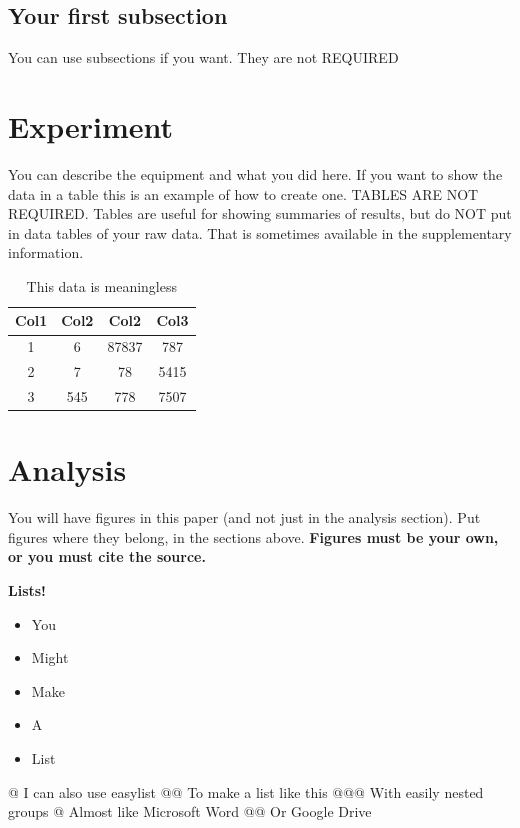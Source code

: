 \documentclass[aps,prb,twocolumn,groupedaddress,nofootinbib,floatfix]{revtex4}
\begin{document}
\subsection*{Your first subsection}
You can use subsections if you want. They are not REQUIRED


\section*{Experiment}

You can describe the equipment and what you did here.   
If you want to show the data in a table this is an example of how to create one. TABLES ARE NOT REQUIRED. Tables are useful for showing summaries of results, but do NOT put in data tables of your raw data. That is sometimes available in the supplementary information.

\begin{table}[h!]
\begin{center}
 \begin{tabular}{||c |||c c| c||} 
 \hline
 Col1 & Col2 & Col2 & Col3 \\
 \hline\hline
 1 & 6 & 87837 & 787 \\ 
 \hline
 2 & 7 & 78 & 5415 \\
 \hline
 3 & 545 & 778 & 7507 \\
 \hline
\end{tabular}
\label{tab:dumbdata}
\caption{This data is meaningless}
\end{center}
\end{table}

\section*{Analysis}

You will have figures in this paper (and not just in the analysis section).  Put figures where they belong, in the sections above.   \textbf{Figures must be your own, or you must cite the source.}  


{\bf Lists!}
\begin{itemize}\itemsep1pt \parskip0pt 
\item You
\item Might
\item Make
\item A
\item List
\end{itemize}
\begin{easylist}
	@ I can also use easylist
	@@ To make a list like this
	@@@ With easily nested groups
	@ Almost like Microsoft Word
	@@ Or Google Drive
\end{easylist}
\end{document}
